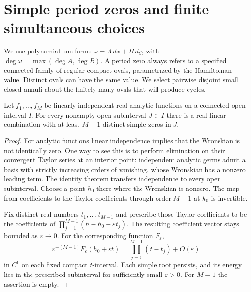 \section{Simple period zeros and finite simultaneous choices}\label{sec:prelim}

We use polynomial one-forms $\omega=A\,dx+B\,dy$, with
$\deg\omega=\max(\deg A,\deg B)$. A period zero always refers to a
specified connected family of regular compact ovals, parametrized by the
Hamiltonian value. Distinct ovals can have the same value. We select
pairwise disjoint small closed annuli about the finitely many ovals that
will produce cycles.

\begin{lemma}\label{lem:jets}
Let $f_1,\ldots,f_M$ be linearly independent real analytic functions on a
connected open interval $I$. For every nonempty open subinterval $J\subset I$
there is a real linear combination with at least $M-1$ distinct simple
zeros in $J$.
\end{lemma}
\begin{proof}
For analytic functions linear independence implies that the Wronskian is
not identically zero. One way to see this is to perform elimination on
their convergent Taylor series at an interior point: independent analytic
germs admit a basis with strictly increasing orders of vanishing, whose
Wronskian has a nonzero leading term. The identity theorem transfers
independence to every open subinterval. Choose a point $h_0$ there where
the Wronskian is nonzero. The map from coefficients to the Taylor
coefficients through order $M-1$ at $h_0$ is invertible.

Fix distinct real numbers $t_1,\ldots,t_{M-1}$ and prescribe those Taylor
coefficients to be the coefficients of
$\prod_{j=1}^{M-1}(h-h_0-\varepsilon t_j)$. The resulting coefficient
vector stays bounded as $\varepsilon\to0$. For the corresponding
function $F_\varepsilon$,
\[
 \varepsilon^{-(M-1)}F_\varepsilon(h_0+\varepsilon t)
 =\prod_{j=1}^{M-1}(t-t_j)+O(\varepsilon)
\]
in $C^1$ on each fixed compact $t$-interval. Each simple root persists,
and its energy lies in the prescribed subinterval for sufficiently small
$\varepsilon>0$. For $M=1$ the assertion is empty.
\end{proof}

